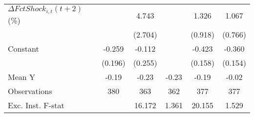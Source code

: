 {\begin{tabular}{l*{5}{c}}
\addlinespace
$ \Delta FctShock_{i,t}(t+2)$ (\%)&                     &       4.743\sym{*}  &                     &       1.326         &       1.067         \\
                    &                     &     (2.704)         &                     &     (0.918)         &     (0.766)         \\
\addlinespace
Constant            &      -0.259         &      -0.112         &                     &      -0.423\sym{**} &      -0.360\sym{**} \\
                    &     (0.196)         &     (0.255)         &                     &     (0.158)         &     (0.154)         \\
\midrule
Mean Y              &       -0.19         &       -0.23         &       -0.23         &       -0.19         &       -0.02         \\
Observations        &         380         &         363         &         362         &         377         &         377         \\
Exc. Inst. F-stat   &                     &      16.172         &       1.361         &      20.155         &       1.529         \\
\bottomrule
\end{tabular}
}
